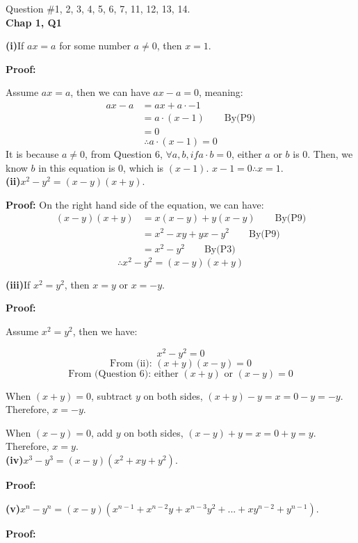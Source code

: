 \documentclass[a4paper,12pt]{report}
\begin{document}
\pagebreak
Question \#1, 2, 3, 4, 5, 6, 7, 11, 12, 13, 14.\\

\noindent
\textbf{Chap 1, Q1} 

\noindent
\textbf{(i)}If $ax=a$ for some number $a\neq0$, then $x=1$.

\noindent
\textbf{Proof:}

\noindent
Assume $ax = a$, then we can have $ax-a=0$, meaning:
\begin{align*}
 ax-a & = ax+a\cdot{-1}\\
 & =a\cdot{(x-1)}\qquad \text{By(P9)}\\
 & =0
\end{align*}
\[\therefore a\cdot{(x-1)}=0 \]
It is because $a\neq 0$, from Question 6, $\forall a,b, if a\cdot{b}=0$, either $a$ or $b$ is $0$. Then, we know $b$ in this equation is 0, which is $(x-1)$. $x-1=0 \therefore x=1$.\\

\noindent
\textbf{(ii)}$x^2-y^2=(x-y)(x+y)$.

\noindent
\textbf{Proof:}
On the right hand side of the equation, we can have:
\begin{align*}
 (x-y)(x+y) & = x(x-y)+y(x-y)\qquad \text{By(P9)}\\
 & =x^2-xy+yx-y^2\qquad \text{By(P9)}\\
 & =x^2-y^2\qquad\text{By(P3)}
\end{align*}
\[\therefore x^2-y^2=(x-y)(x+y)\]

\noindent
\textbf{(iii)}If $x^2=y^2$, then $x=y$ or $x=-y$.

\noindent
\textbf{Proof:}

\noindent
Assume $x^2=y^2$, then we have:

\[x^2-y^2=0\]
\[\text{From (ii): } (x+y)(x-y)=0 \]
\[\text{From (Question 6): either } (x+y)\text{ or }(x-y)=0 \]

\noindent
When $(x+y)=0$, subtract $y$ on both sides, $(x+y)-y=x=0-y=-y$. Therefore, $x=-y$.

\noindent
When $(x-y)=0$, add $y$ on both sides, $(x-y)+y=x=0+y=y$. Therefore, $x=y$.\\

\noindent
\textbf{(iv)}$x^3-y^3=(x-y)(x^2+xy+y^2)$.

\noindent
\textbf{Proof:}

\noindent
\textbf{(v)}$x^n-y^n=(x-y)(x^{n-1}+x^{n-2}y+x^{n-3}y^2+...+xy^{n-2}+y^{n-1})$.

\noindent
\textbf{Proof:}
\end{document}
